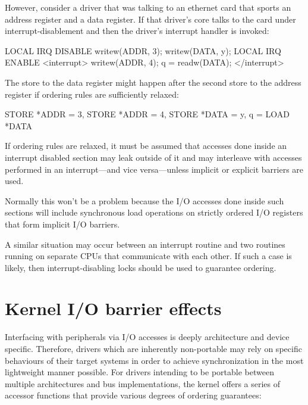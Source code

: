 However, consider a driver that was talking to an ethernet card that sports an
address register and a data register.
If that driver's core talks to the card under interrupt-disablement and then
the driver's interrupt handler is invoked:

\begin{VerbatimU}
	LOCAL IRQ DISABLE
	writew(ADDR, 3);
	writew(DATA, y);
	LOCAL IRQ ENABLE
	<interrupt>
	writew(ADDR, 4);
	q = readw(DATA);
	</interrupt>
\end{VerbatimU}

The store to the data register might happen after the second store to the
address register if ordering rules are sufficiently relaxed:

\begin{VerbatimU}
	STORE *ADDR = 3, STORE *ADDR = 4, STORE *DATA = y, q = LOAD *DATA
\end{VerbatimU}

If ordering rules are relaxed, it must be assumed that accesses done inside an
interrupt disabled section may leak outside of it and may interleave with
accesses performed in an interrupt---and vice versa---unless implicit or
explicit barriers are used.

Normally this won't be a problem because the I/O accesses done inside such
sections will include synchronous load operations on strictly ordered I/O
registers that form implicit I/O barriers.


A similar situation may occur between an interrupt routine and two routines
running on separate CPUs that communicate with each other.
If such a case is likely, then interrupt-disabling locks should be used to
guarantee ordering.


\section{Kernel I/O barrier effects}

Interfacing with peripherals via I/O accesses is deeply architecture and device
specific.
Therefore, drivers which are inherently non-portable may rely on specific
behaviours of their target systems in order to achieve synchronization
in the most lightweight manner possible.
For drivers intending to be portable between multiple architectures and
bus implementations, the kernel offers a series of accessor functions that
provide various degrees of ordering guarantees:


